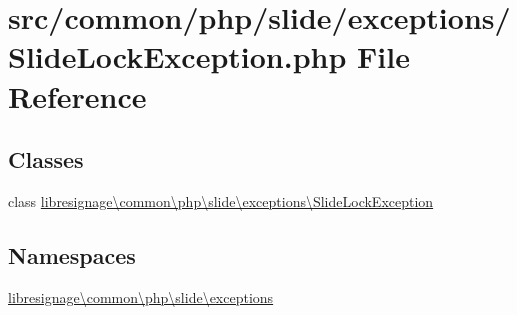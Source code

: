 \hypertarget{SlideLockException_8php}{}\section{src/common/php/slide/exceptions/\+Slide\+Lock\+Exception.php File Reference}
\label{SlideLockException_8php}
\subsection*{Classes}
\begin{DoxyCompactItemize}
\item 
class \hyperlink{classlibresignage_1_1common_1_1php_1_1slide_1_1exceptions_1_1SlideLockException}{libresignage\textbackslash{}common\textbackslash{}php\textbackslash{}slide\textbackslash{}exceptions\textbackslash{}\+Slide\+Lock\+Exception}
\end{DoxyCompactItemize}
\subsection*{Namespaces}
\begin{DoxyCompactItemize}
\item 
 \hyperlink{namespacelibresignage_1_1common_1_1php_1_1slide_1_1exceptions}{libresignage\textbackslash{}common\textbackslash{}php\textbackslash{}slide\textbackslash{}exceptions}
\end{DoxyCompactItemize}
